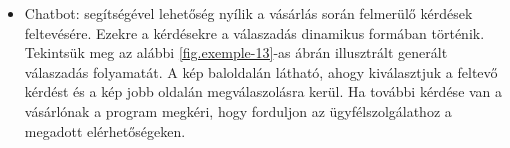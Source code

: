 \begin{itemize}
	\item Chatbot: segítségével lehetőség nyílik a vásárlás során felmerülő kérdések feltevésére. Ezekre a kérdésekre a válaszadás dinamikus formában történik. Tekintsük meg az alábbi \ref{fig.exemple-13}-as ábrán illusztrált generált válaszadás folyamatát. A kép baloldalán látható, ahogy kiválasztjuk a feltevő kérdést és a kép jobb oldalán megválaszolásra kerül. Ha további kérdése van a vásárlónak a program megkéri, hogy forduljon az ügyfélszolgálathoz a megadott elérhetőségeken.
	\begin{figure}[H]
		\centering
		\hspace{5pt}

\end{figure}
\end{itemize}
